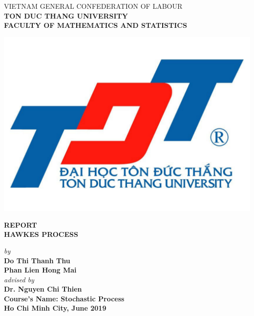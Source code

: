 	\newpage
	\thispagestyle{empty}
	\renewcommand{\baselinestretch}{1.2}
	
	\begin{center}
		\large{VIETNAM GENERAL CONFEDERATION OF LABOUR} \\
		\large{\textbf{TON DUC THANG UNIVERSITY}} \\
		\large{\textbf{FACULTY OF MATHEMATICS AND STATISTICS}} \\
		\vspace*{1cm}
		
		\includegraphics[scale=0.12,bb=0 0 800 600]{TDT_logo.pdf} \\
		\vspace*{1cm}
		
		\large{\textbf{REPORT}} \\ 
		\LARGE{\textbf{HAWKES PROCESS}} \\

		\vspace*{1cm}
		
		\Large{\textit{by}} \\
		\Large{\textbf{Do Thi Thanh Thu}}\\
		\Large{\textbf{Phan Lien Hong Mai}}\\
		\Large{\textit{advised by}} \\
		\Large{\textbf{Dr. Nguyen Chi Thien}} \\
	    \vspace{2.5cm}
	    \Large{\textbf{Course's Name: Stochastic Process}} \\
	    \vspace{1cm}
		\Large{\textbf{Ho Chi Minh City, June 2019}}
		
	\end{center}
	

